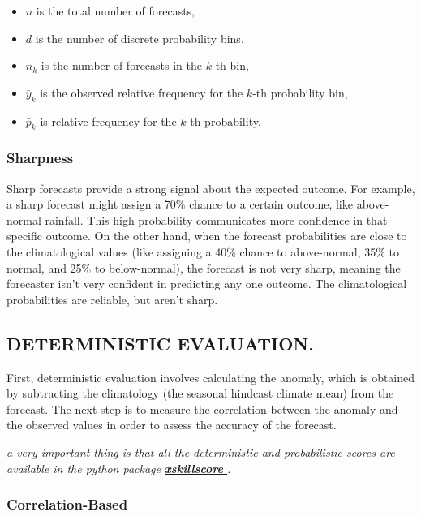 \documentclass[11pt]{article}
\begin{document}
\begin{itemize}
    \item $n$ is the total number of forecasts,
    \item $d$ is the number of discrete probability bins,
    \item $n_k$ is the number of forecasts in the $k$-th bin,
    \item $\bar{y}_k$ is the observed relative frequency for the $k$-th probability bin,
    \item $\bar{p}_k$ is relative frequency for the $k$-th probability.
\end{itemize}


		\subsubsection{Sharpness}
Sharp forecasts provide a strong signal about the expected outcome. For example, a sharp forecast might assign a 70\% chance to a certain outcome, like above-normal rainfall. This high probability communicates more confidence in that specific outcome.
On the other hand, when the forecast probabilities are close to the climatological values (like assigning a 40\% chance to above-normal, 35\% to normal, and 25\% to below-normal), the forecast is not very sharp, meaning the forecaster isn't very confident in predicting any one outcome.
The climatological probabilities are reliable, but aren’t sharp.

	\subsection{DETERMINISTIC EVALUATION.}
	First, deterministic evaluation involves calculating the anomaly, which is obtained by subtracting the climatology (the seasonal hindcast climate mean) from the forecast. The next step is to measure the correlation between the anomaly and the observed values in order to assess the accuracy of the forecast. 
	
	
	\textit{	a very important thing is that all the deterministic and probabilistic scores are available in the python package \hyperlink{https://xskillscore.readthedocs.io/en/stable/quick-start.html}{\textbf{xskillscore} }.\footnotemark{}}
	
	\subsubsection{Correlation-Based}
	
\end{document}
